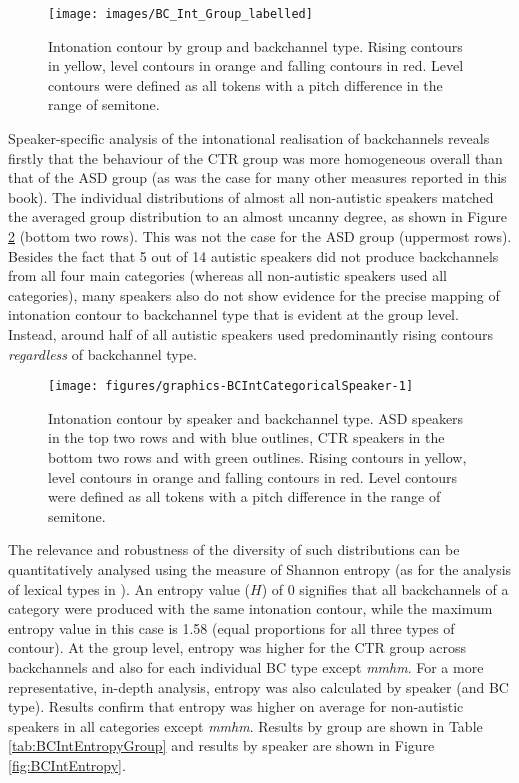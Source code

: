 \begin{figure}

\texttt{[image: images/BC\_Int\_Group\_labelled]} \hfill{}

\caption{Intonation contour by group and backchannel type. Rising contours in yellow, level contours in orange and falling contours in red. Level contours were defined as all tokens with a pitch difference in the range of  semitone.}\label{fig:BCIntCategoricalGroupPic}
\end{figure}


Speaker-specific analysis of the intonational realisation of backchannels reveals firstly that the behaviour of the CTR group was more homogeneous overall than that of the ASD group (as was the case for many other measures reported in this book). The individual distributions of almost all non-autistic speakers matched the averaged group distribution to an almost uncanny degree, as shown in Figure \ref{fig:BCIntCategoricalSpeaker} (bottom two rows). This was not the case for the ASD group (uppermost rows). Besides the fact that 5 out of 14 autistic speakers did not produce backchannels from all four main categories (whereas all non-autistic speakers used all categories), many speakers also do not show evidence for the precise mapping of intonation contour to backchannel type that is evident at the group level. Instead, around half of all autistic speakers used predominantly rising contours \emph{regardless} of backchannel type.



\begin{figure}

{\texttt{[image: figures/graphics-BCIntCategoricalSpeaker-1]}
	
}

\caption{Intonation contour by speaker and backchannel type. ASD speakers in the top two rows and with blue outlines, CTR speakers in the bottom two rows and with green outlines. Rising contours in yellow, level contours in orange and falling contours in red. Level contours were defined as all tokens with a pitch difference in the range of  semitone.}\label{fig:BCIntCategoricalSpeaker}
\end{figure}



The relevance and robustness of the diversity of such distributions can be quantitatively analysed using the measure of Shannon entropy (as for the analysis of lexical types in ). An entropy value (\(H\)) of 0 signifies that all backchannels of a category were produced with the same intonation contour, while the maximum entropy value in this case is 1.58 (equal proportions for all three types of contour). At the group level, entropy was higher for the CTR group across backchannels and also for each individual BC type except \emph{mmhm}. For a more representative, in-depth analysis, entropy was also calculated by speaker (and BC type). Results confirm that entropy was higher on average for non-autistic speakers in all categories except \emph{mmhm}. Results by group are shown in Table \ref{tab:BCIntEntropyGroup} and results by speaker are shown in Figure \ref{fig:BCIntEntropy}.

